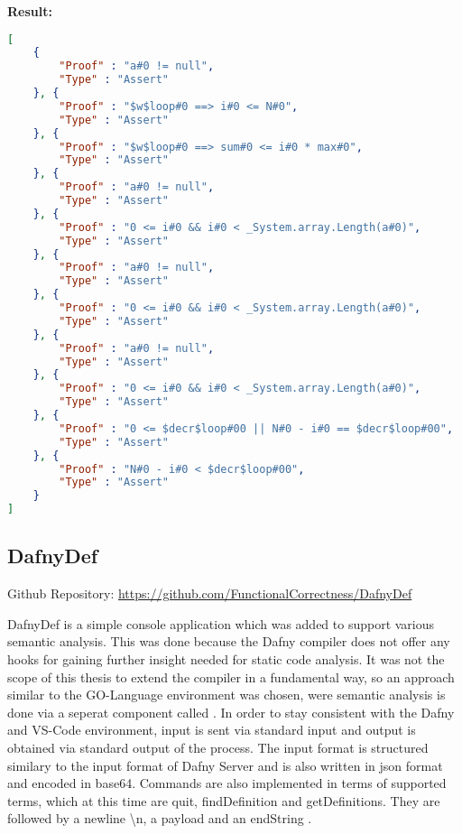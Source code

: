 \textbf{Result: }
\begin{lstlisting}[language=json,firstnumber=1]
[
	{
		"Proof" : "a#0 != null",
		"Type" : "Assert"
	}, {
		"Proof" : "$w$loop#0 ==> i#0 <= N#0",
		"Type" : "Assert"
	}, {
		"Proof" : "$w$loop#0 ==> sum#0 <= i#0 * max#0",
		"Type" : "Assert"
	}, {
		"Proof" : "a#0 != null",
		"Type" : "Assert"
	}, {
		"Proof" : "0 <= i#0 && i#0 < _System.array.Length(a#0)",
		"Type" : "Assert"
	}, {
		"Proof" : "a#0 != null",
		"Type" : "Assert"
	}, {
		"Proof" : "0 <= i#0 && i#0 < _System.array.Length(a#0)",
		"Type" : "Assert"
	}, {
		"Proof" : "a#0 != null",
		"Type" : "Assert"
	}, {
		"Proof" : "0 <= i#0 && i#0 < _System.array.Length(a#0)",
		"Type" : "Assert"
	}, {
		"Proof" : "0 <= $decr$loop#00 || N#0 - i#0 == $decr$loop#00",
		"Type" : "Assert"
	}, {
		"Proof" : "N#0 - i#0 < $decr$loop#00",
		"Type" : "Assert"
	}
]
\end{lstlisting}




\subsection{DafnyDef}
Github Repository: \href{https://github.com/FunctionalCorrectness/DafnyDef}{https://github.com/FunctionalCorrectness/DafnyDef}

DafnyDef is a simple console application which was added to support various semantic analysis. This was done because the Dafny compiler does not offer any hooks for gaining further insight needed for static code analysis. It was not the scope of this thesis to extend the compiler in a fundamental way, so an approach similar to the GO-Language environment was chosen, were semantic analysis is done via a seperat component called \cite{godef}. \newline
In order to stay consistent with the Dafny and VS-Code environment, input is sent via standard input and output is obtained via standard output of the process. The input format is structured similary to the input format of Dafny Server and is also written in json format and encoded in base64. Commands are also implemented in terms of supported terms, which at this time are quit, findDefinition and getDefinitions. They are followed by a newline \textbackslash{n}, a payload and an endString . \newline



